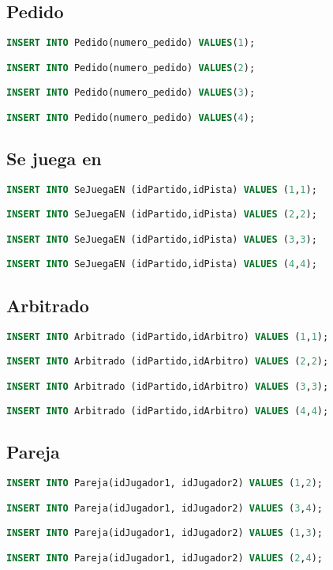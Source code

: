 \subsection{Pedido}
\begin{lstlisting}[language=sql]
INSERT INTO Pedido(numero_pedido) VALUES(1);

INSERT INTO Pedido(numero_pedido) VALUES(2);

INSERT INTO Pedido(numero_pedido) VALUES(3);

INSERT INTO Pedido(numero_pedido) VALUES(4);
\end{lstlisting}

\subsection{Se juega en}
\begin{lstlisting}[language=sql]
INSERT INTO SeJuegaEN (idPartido,idPista) VALUES (1,1);

INSERT INTO SeJuegaEN (idPartido,idPista) VALUES (2,2);

INSERT INTO SeJuegaEN (idPartido,idPista) VALUES (3,3);

INSERT INTO SeJuegaEN (idPartido,idPista) VALUES (4,4);
\end{lstlisting}

\subsection{Arbitrado}
\begin{lstlisting}[language=sql]
INSERT INTO Arbitrado (idPartido,idArbitro) VALUES (1,1);

INSERT INTO Arbitrado (idPartido,idArbitro) VALUES (2,2);

INSERT INTO Arbitrado (idPartido,idArbitro) VALUES (3,3);

INSERT INTO Arbitrado (idPartido,idArbitro) VALUES (4,4);
\end{lstlisting}

\subsection{Pareja}
\begin{lstlisting}[language=sql]
INSERT INTO Pareja(idJugador1, idJugador2) VALUES (1,2);

INSERT INTO Pareja(idJugador1, idJugador2) VALUES (3,4);

INSERT INTO Pareja(idJugador1, idJugador2) VALUES (1,3);

INSERT INTO Pareja(idJugador1, idJugador2) VALUES (2,4);
\end{lstlisting}

